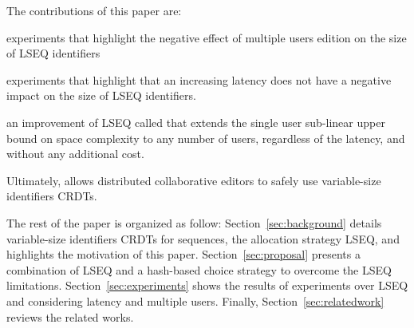 The contributions of this paper are:
\begin{inparaenum}[(i)]
\item experiments that highlight the negative effect of multiple users edition
  on the size of LSEQ identifiers
\item experiments that highlight that an increasing latency does not have a
  negative impact on the size of LSEQ identifiers.
\item an improvement of LSEQ called \NAME{} that extends the single user
  sub-linear upper bound on space complexity to any number of users, regardless
  of the latency, and without any additional cost.
\end{inparaenum} 

Ultimately, \NAME{} allows distributed collaborative editors to safely use
variable-size identifiers CRDTs.

The rest of the paper is organized as follow: Section~\ref{sec:background}
details variable-size identifiers CRDTs for sequences, the allocation strategy
LSEQ, and highlights the motivation of this paper.  Section~\ref{sec:proposal}
presents \NAME{} a combination of LSEQ and a hash-based choice strategy to
overcome the LSEQ limitations.  Section~\ref{sec:experiments} shows the results
of experiments over LSEQ and \NAME{} considering latency and multiple
users. Finally, Section~\ref{sec:relatedwork} reviews the related works.


